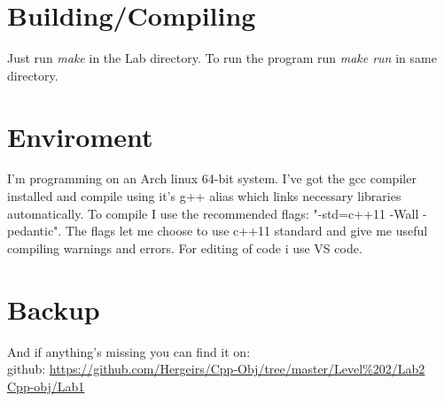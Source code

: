 \documentclass[11pt]{article}
\begin{document}
\section{Building/Compiling}
Just run \emph{make} in the Lab directory.
To run the program run \emph{make run} in same directory.

\section{Enviroment}
I'm programming on an Arch linux 64-bit system. I've got the gcc compiler installed and compile using it's g++ alias which links necessary libraries automatically. To compile I use the recommended flags: "-std=c++11 -Wall -pedantic". The flags let me choose to use c++11 standard and give me useful compiling warnings and errors. 
For editing of code i use VS code.

\section{Backup}
And if anything's missing you can find it on: \\
github: \url{https://github.com/Hergeirs/Cpp-Obj/tree/master/Level%202/Lab2} \\
\href{https://github.com/Hergeirs/Cpp-Obj/tree/master/Level%202/Lab2}{Cpp-obj/Lab1}



\flushright{\today}
\end{document}
